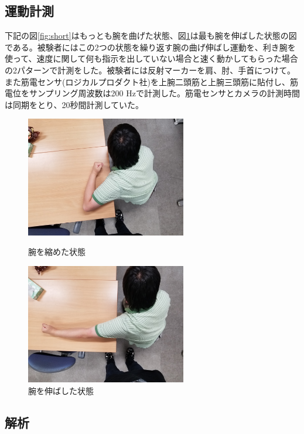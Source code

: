 \documentclass{jsarticle}
\begin{document}
\subsection{運動計測}
下記の図\ref{fig:short}はもっとも腕を曲げた状態、図\ref{fig:long}は最も腕を伸ばした状態の図である。被験者にはこの2つの状態を繰り返す腕の曲げ伸ばし運動を、利き腕を使って、速度に関して何も指示を出していない場合と速く動かしてもらった場合の2パターンで計測をした。被験者には反射マーカーを肩、肘、手首につけて。また筋電センサ(ロジカルプロダクト社)を上腕二頭筋と上腕三頭筋に貼付し、筋電位をサンプリング周波数は200 Hzで計測した。筋電センサとカメラの計測時間は同期をとり、20秒間計測していた。
\begin{figure}[h]
  \begin{minipage}{0.5\hsize}
    \begin{center}
      \includegraphics[width=7cm]{images/short.jpg}
    \end{center}
    \caption{腕を縮めた状態}
    \label{fig:short}
  \end{minipage}
  \begin{minipage}{0.5\hsize}
    \begin{center}
      \includegraphics[width=7cm]{images/long.jpg}
    \end{center}
    \caption{腕を伸ばした状態}
    \label{fig:long}
  \end{minipage}
\end{figure}

\subsection{解析}
\end{document}
